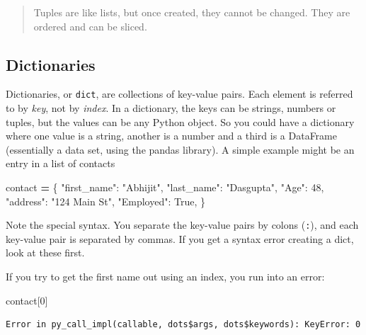 \documentclass[
  letterpaper,
]{scrbook}
\newenvironment{Shaded}{\begin{snugshade}}{\end{snugshade}}
\newcommand{\DecValTok}[1]{\textcolor[rgb]{0.00,0.00,0.81}{#1}}
\newcommand{\NormalTok}[1]{#1}
\newcommand{\OperatorTok}[1]{\textcolor[rgb]{0.81,0.36,0.00}{\textbf{#1}}}
\newcommand{\StringTok}[1]{\textcolor[rgb]{0.31,0.60,0.02}{#1}}
\newcommand{\VariableTok}[1]{\textcolor[rgb]{0.00,0.00,0.00}{#1}}
\begin{document}
\begin{quote}
Tuples are like lists, but once created, they cannot be changed. They are ordered and can be sliced.
\end{quote}

\hypertarget{dictionaries}{%
\subsection{Dictionaries}\label{dictionaries}}

Dictionaries, or \texttt{dict}, are collections of key-value pairs. Each element is referred to by \emph{key}, not by \emph{index}. In a dictionary, the keys can be strings, numbers or tuples, but the values can be any Python object. So you could have a dictionary where one value is a string, another is a number and a third is a DataFrame (essentially a data set, using the pandas library). A simple example might be an entry in a list of contacts

\begin{Shaded}
\begin{Highlighting}[]
\NormalTok{contact }\OperatorTok{=}\NormalTok{ \{}
    \StringTok{"first_name"}\NormalTok{: }\StringTok{"Abhijit"}\NormalTok{,}
    \StringTok{"last_name"}\NormalTok{: }\StringTok{"Dasgupta"}\NormalTok{,}
    \StringTok{"Age"}\NormalTok{: }\DecValTok{48}\NormalTok{,}
    \StringTok{"address"}\NormalTok{: }\StringTok{"124 Main St"}\NormalTok{,}
    \StringTok{"Employed"}\NormalTok{: }\VariableTok{True}\NormalTok{,}
\NormalTok{\}}
\end{Highlighting}
\end{Shaded}

Note the special syntax. You separate the key-value pairs by colons (\texttt{:}), and each key-value pair is separated by commas. If you get a syntax error creating a dict, look at these first.

If you try to get the first name out using an index, you run into an error:

\begin{Shaded}
\begin{Highlighting}[]
\NormalTok{contact[}\DecValTok{0}\NormalTok{]}
\end{Highlighting}
\end{Shaded}

\begin{verbatim}
Error in py_call_impl(callable, dots$args, dots$keywords): KeyError: 0
\end{verbatim}
\end{document}
